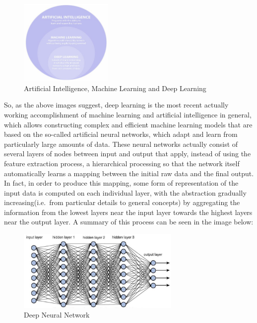 \vspace{3mm}

\begin{figure}[h]
    \centering
    \includegraphics[width=0.4\textwidth]{../img/AI_ML_DL_2}
    \caption{Artificial Intelligence, Machine Learning and Deep Learning}
\end{figure}

\newpage

So, as the above images suggest, deep learning is the most recent
actually working accomplishment of machine learning and artificial
intelligence in general, which allows constructing complex and efficient
machine learning models that are based on the so-called artificial
neural networks, which adapt and learn from particularly large amounts
of data. These neural networks actually consist of several layers of
nodes between input and output that apply, instead of using the feature
extraction process, a hierarchical processing so that the network
itself automatically learns a mapping between the initial raw data and
the final output. In fact, in order to produce this mapping, some form
of representation of the input data is computed on each individual layer,
with the abstraction gradually increasing(i.e.\ from particular details
to general concepts) by aggregating the information from the lowest
layers near the input layer towards the highest layers near the output
layer. A summary of this process can be seen in the image below:

\vspace{5mm}

\begin{figure}[h]
    \centering
    \includegraphics[width=0.7\textwidth]{../img/DNN}
    \caption{Deep Neural Network}
\end{figure}

